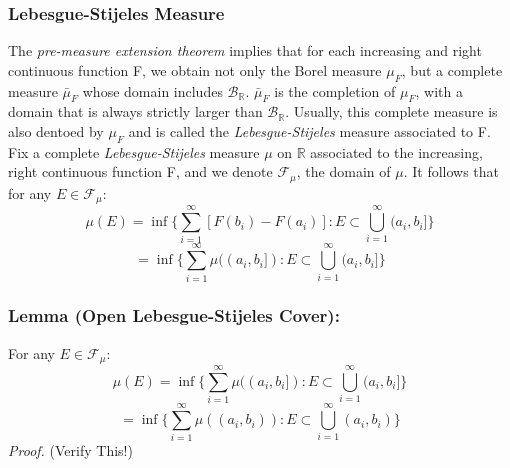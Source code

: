 \documentclass{article}
\begin{document}
\subsubsection{Lebesgue-Stijeles Measure}
The \emph{pre-measure extension theorem} implies that for each increasing and right continuous function F, we obtain not only the Borel measure $\mu_F$, but a complete measure $\bar{\mu}_F$ whose domain includes $\mathcal{B}_{\mathbb{R}}$. $\bar{\mu}_F$ is the completion of $\mu_F$, with a domain that is always strictly larger than $\mathcal{B}_{\mathbb{R}}$. Usually, this complete measure is also dentoed by $\mu_F$ and is called the \emph{Lebesgue-Stijeles} measure associated to F. \newline \newline
Fix a complete \emph{Lebesgue-Stijeles} measure $\mu$ on $\mathbb{R}$ associated to the increasing, right continuous function F, and we denote $\mathcal{F}_\mu$, the domain of $\mu$. It follows that for any $E\in \mathcal{F}_\mu$:
\[
\mu(E)=\inf\{\sum_{i=1}^{\infty}[F(b_i)-F(a_i)]:E\subset\bigcup_{i=1}^{\infty}(a_i,b_i]\}
\]
\[
=\inf\{\sum_{i=1}^{\infty}\mu((a_i,b_i]):E\subset\bigcup_{i=1}^{\infty}(a_i,b_i]\}
\]

\subsubsection{Lemma (Open Lebesgue-Stijeles Cover):}
For any $E  \in \mathcal{F}_\mu$:
\[
\mu(E) = \inf\{\sum_{i=1}^{\infty}\mu((a_i,b_i]):E\subset\bigcup_{i=1}^{\infty}(a_i,b_i]\}
\]
\[
=\inf\{\sum_{i=1}^{\infty}\mu((a_i,b_i)):E\subset\bigcup_{i=1}^{\infty}(a_i,b_i)\}
\]
\textit{Proof.}\newline \newline
(Verify This!) 
\end{document}
